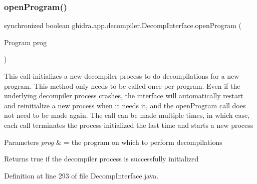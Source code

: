 \subsubsection{\texorpdfstring{openProgram()}{openProgram()}}
{\footnotesize\ttfamily synchronized boolean ghidra.\+app.\+decompiler.\+Decomp\+Interface.\+open\+Program (\begin{DoxyParamCaption}\item[{Program}]{prog }\end{DoxyParamCaption})\hspace{0.3cm}{\ttfamily [inline]}}

This call initializes a new decompiler process to do decompilations for a new program. This method only needs to be called once per program. Even if the underlying decompiler process crashes, the interface will automatically restart and reinitialize a new process when it needs it, and the open\+Program call does not need to be made again. The call can be made multiple times, in which case, each call terminates the process initialized the last time and starts a new process 
\begin{DoxyParams}{Parameters}
{\em prog} & = the program on which to perform decompilations \\
\hline
\end{DoxyParams}
\begin{DoxyReturn}{Returns}
true if the decompiler process is successfully initialized 
\end{DoxyReturn}


Definition at line 293 of file Decomp\+Interface.\+java.

